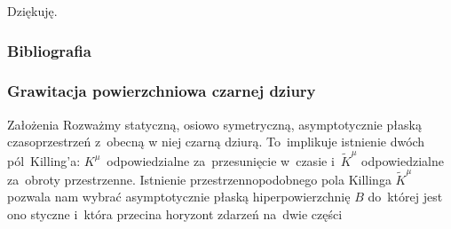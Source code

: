 \documentclass{beamer}  %
\begin{document}
\begin{frame}

  \begin{center}
    \LARGE Dziękuję.
  \end{center}

\end{frame}





\begin{frame}
  \frametitle{Bibliografia}

  \begin{block}{}
     {}
  \end{block}

\end{frame}





\begin{frame}
  \frametitle{Grawitacja powierzchniowa czarnej dziury}

  \begin{block}{Założenia}
    Rozważmy statyczną, osiowo symetryczną, asymptotycznie płaską
    czasoprzestrzeń z~obecną w niej czarną dziurą. To~implikuje
    istnienie dwóch pól~Killing'a: $K^{ \mu }$~odpowiedzialne
    za~przesunięcie w~czasie i~$\tilde{ K }^{ \mu }$ odpowiedzialne
    za~obroty przestrzenne. Istnienie przestrzennopodobnego pola
    Killinga $\tilde{ K }^{ \mu }$ pozwala nam wybrać asymptotycznie
    płaską hiperpowierzchnię $B$ do~której jest ono styczne i~która
    przecina horyzont zdarzeń na~dwie części
  \end{block}

\end{frame}
\end{document}

